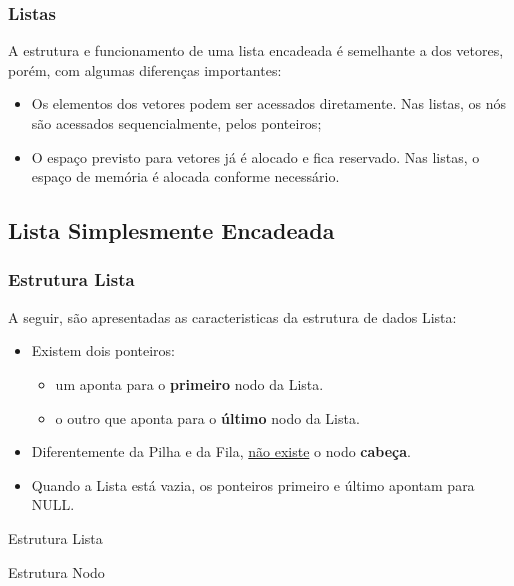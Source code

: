 \documentclass[aspectratio=169]{beamer}
\begin{document}
\begin{frame}
\frametitle{Listas}
A estrutura e funcionamento de uma lista encadeada é semelhante a dos vetores, porém, com algumas diferenças importantes:
\begin{itemize}
 \item Os elementos dos vetores podem ser acessados diretamente. Nas listas, os nós são acessados sequencialmente, pelos ponteiros;
 \item O espaço previsto para vetores já é alocado e fica reservado. Nas listas, o espaço de memória é alocada conforme necessário.
\end{itemize}
\end{frame}

\subsection{Lista Simplesmente Encadeada}

\begin{frame}
\frametitle{Estrutura Lista}
A seguir, são apresentadas as caracteristicas da estrutura de dados Lista:
\begin{itemize}
 \item Existem dois ponteiros:
 \begin{itemize}
    \item um aponta para o {\bf primeiro} nodo da Lista.
    \item o outro que aponta para o {\bf último} nodo da Lista.
 \end{itemize}
 \item Diferentemente da Pilha e da Fila, \underline{não existe} o nodo {\bf cabeça}.
 \item Quando a Lista está vazia, os ponteiros primeiro e último apontam para NULL.
\end{itemize}
\end{frame}


\begin{frame}[fragile]{Estrutura Lista}
\begin{algorithm}[H]
\caption{Lista} 
\label{Lista}
\end{algorithm} 
\end{frame}


\begin{frame}[fragile]{Estrutura Nodo}
\begin{algorithm}[H]
\caption{Nodo} 
\label{Nodo}
\end{algorithm} 
\end{frame}
\end{document}
